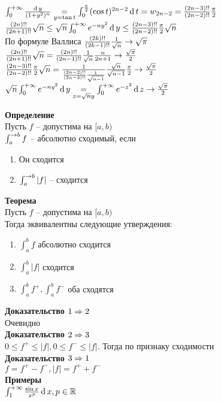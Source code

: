 \documentclass[12pt]{article}
\begin{document}
\begin{enumerate}
    $\int_0^{+\infty} \frac{\operatorname{d} y}{(1+y^2)^n} \underset{y=\tan t}= \int_0^{\frac\pi2} (\cos t)^{2n-2}\operatorname{d} t = w_{2n-2} = \frac{(2n-3)!!}{(2n-2)!!}\frac\pi2$\\
    $\frac{(2n)!!}{(2n+1)!!}\sqrt n \leq \sqrt n\int_0^{+\infty} e^{-ny^2}\operatorname{d} y \leq \frac{(2n-3)!!}{(2n-2)!!}\frac\pi2\sqrt n$\\
    По формуле Валлиса $\frac{(2k)!!}{(2k-1)!!}\frac1{\sqrt n} \rightarrow \sqrt \pi$\\
    $\frac{(2n)!!}{(2n+1)!!}\sqrt n = \frac{(2n)!!}{(2n-1)!!}\frac1{\sqrt n}\frac n{2n+1} \rightarrow \frac{\sqrt\pi}2$\\
    $\frac{(2n-3)!!}{(2n-2)!!}\frac\pi2\sqrt n = \frac1{\frac{(2n-2)!!}{(2n-3)!!}\frac1{\sqrt {n-1}}}\frac{\sqrt n}{\sqrt{n-1}}\frac\pi2 \rightarrow \frac{\sqrt\pi}2$\\
    $\sqrt n\int_0^{+\infty} e^{-ny^2}\operatorname{d} y \underset{z=\sqrt n y}= \int_0^{+\infty}e^{-z^2}\operatorname{d} z \rightarrow \frac{\sqrt\pi}2$
\end{enumerate}
\textbf{Определение}\\
Пусть $f$ -- допустима на $[a,b)$\\
$\int_a^{\rightarrow b} f$ -- абсолютно сходимый, если
\begin{enumerate}
    \item Он сходится
    \item $\int_a^{\rightarrow b} |f|$ -- сходится
\end{enumerate}
\textbf{Теорема}\\
Пусть $f$ -- допустима на $[a,b)$\\
Тогда эквивалентны следующие утверждения:
\begin{enumerate}
    \item $\int_a^b f$ абсолютно сходится
    \item $\int_a^b |f|$ сходится
    \item $\int_a^b f^+, \int_a^b f^-$ оба сходятся
\end{enumerate}
\textbf{Доказательство $1 \Rightarrow 2$}\\
Очевидно\\
\textbf{Доказательство $2 \Rightarrow 3$}\\
$0 \leq f^+ \leq |f|, 0 \leq f^- \leq |f|$. Тогда по признаку сходимости\\
\textbf{Доказательство $3 \Rightarrow 1$}\\
$f = f^+ - f^-, |f| = f^+ + f^-$\\
\textbf{Примеры}\\
$\int_1^{+\infty} \frac{\sin x}{x^p} \operatorname{d} x, p \in \mathbb{R}$\\
\end{document}
